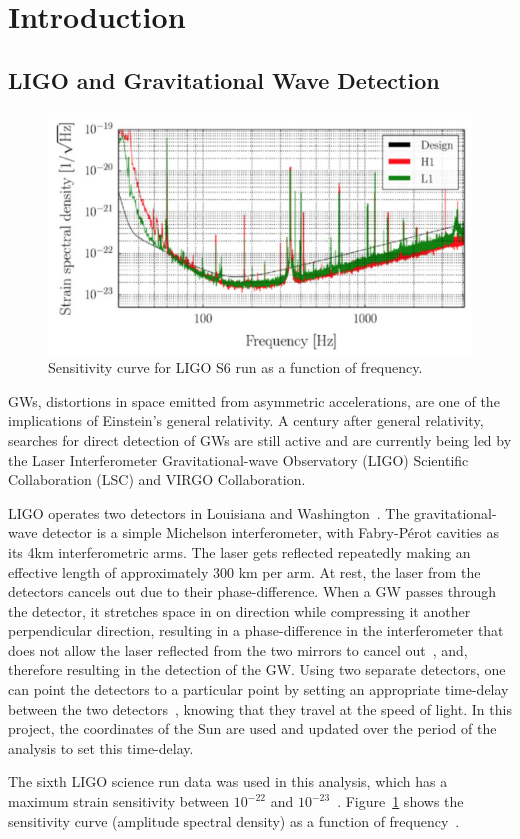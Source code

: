 \section{Introduction}
\subsection{LIGO and Gravitational Wave Detection}
\begin{figure}[htbp]
\begin{center}
\includegraphics[width=\textwidth]{sencurve}
\caption{Sensitivity curve for LIGO S6 run as a function of frequency.}
\label{sencurve}
\end{center}
\end{figure}

GWs, distortions in space emitted from asymmetric accelerations, are one of the implications of Einstein's general relativity. A century after general relativity, searches for direct detection of GWs are still active and are currently being led by the Laser Interferometer Gravitational-wave Observatory (LIGO) Scientific Collaboration (LSC) and VIRGO Collaboration. 

\par{}
LIGO operates two detectors in Louisiana and Washington~\cite{ligo}. The gravitational-wave detector is a simple Michelson interferometer, with Fabry-P\'{e}rot cavities as its 4km interferometric arms. The laser gets reflected repeatedly making an effective length of approximately 300 km per arm. At rest, the laser from the detectors cancels out due to their phase-difference. When a GW passes through the detector, it stretches space in on direction while compressing it another perpendicular direction, resulting in a phase-difference in the interferometer that does not allow the laser reflected from the two mirrors to cancel out~\cite{kip}, and, therefore resulting in the detection of the GW. Using two separate detectors, one can point the detectors to a particular point by setting an appropriate time-delay between the two detectors~\cite{sgwb}, knowing that they travel at the speed of light. In this project, the coordinates of the Sun are used and updated over the period of the analysis to set this time-delay.
\par{}
The sixth LIGO science run data was used in this analysis, which has a maximum strain sensitivity between $10^{-22}$ and $10^{-23}$~\cite{LIGO:2012aa}. Figure~\ref{sencurve} shows the sensitivity curve (amplitude spectral density) as a function of frequency~\cite{newplot}. 

